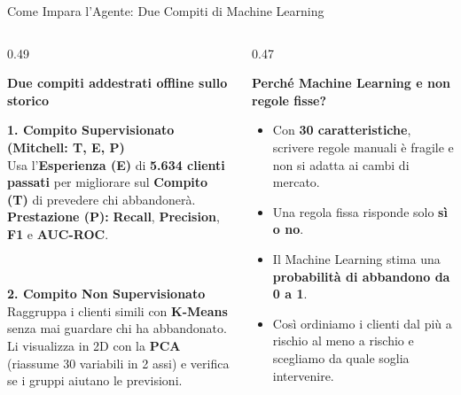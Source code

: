 \documentclass[aspectratio=169, 10pt]{beamer}
\newcommand{\card}[3]{%
    \colorbox{#1}{\parbox{\dimexpr#2-2\fboxsep\relax}{\raggedright #3}}%
}
\begin{document}
\begin{frame}{Come Impara l'Agente: Due Compiti di Machine Learning}
    \begin{columns}[T, onlytextwidth]
        \begin{column}{0.49\textwidth}
            \raggedright
            \textbf{\color{PrimaryNavy} Due compiti addestrati offline sullo storico}
            \vspace{1.8mm}

            \card{CardBlue}{\linewidth}{\footnotesize
                \textbf{\color{PrimaryNavy}\small 1. Compito Supervisionato (Mitchell: T, E, P)}\\[2pt]
                Usa l'\textbf{Esperienza (E)} di \textbf{5.634 clienti passati} per migliorare sul \textbf{Compito (T)} di prevedere chi abbandonerà.\\[2pt]
                \textbf{Prestazione (P):} \textbf{Recall}, \textbf{Precision}, \textbf{F1} e \textbf{AUC-ROC}.
            }\\[2.5mm]

            \card{CardGreen}{\linewidth}{\footnotesize
                \textbf{\color{AccentGreen}\small 2. Compito Non Supervisionato}\\[2pt]
                Raggruppa i clienti simili con \textbf{K-Means} senza mai guardare chi ha abbandonato.\\[2pt]
                Li visualizza in 2D con la \textbf{PCA} (riassume 30 variabili in 2 assi) e verifica se i gruppi aiutano le previsioni.
            }
        \end{column}

        \begin{column}{0.47\textwidth}
            \raggedright
            \textbf{\color{PrimaryNavy} Perché Machine Learning e non regole fisse?}
            \vspace{1.8mm}

            \begin{itemize}
                \setlength{\itemsep}{5pt}
                \small
                \item Con \textbf{30 caratteristiche}, scrivere regole manuali è fragile e non si adatta ai cambi di mercato.
                \item Una regola fissa risponde solo \textbf{sì o no}.
                \item Il Machine Learning stima una \textbf{probabilità di abbandono da 0 a 1}.
                \item Così ordiniamo i clienti dal più a rischio al meno a rischio e scegliamo da quale soglia intervenire.
            \end{itemize}
        \end{column}
    \end{columns}


\end{frame}
\end{document}
